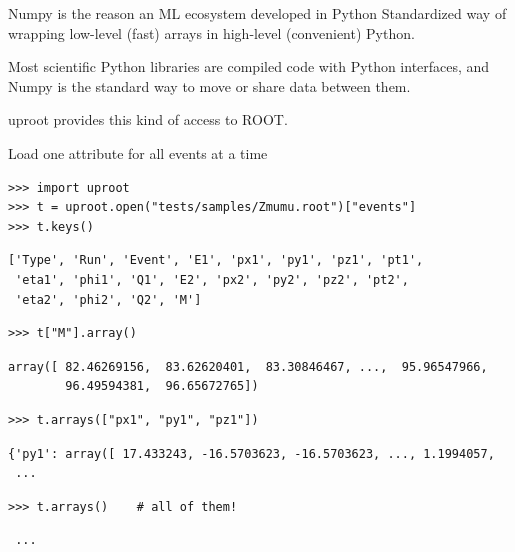 \documentclass[aspectratio=169]{beamer}
\begin{document}
\begin{frame}{Numpy is the reason an ML ecosystem developed in Python}
\vspace{0.5 cm}
\Large
Standardized way of wrapping low-level (fast) arrays in high-level (convenient) Python.

\vspace{0.75 cm}
Most scientific Python libraries are compiled code with Python interfaces, and Numpy is the standard way to move or share data between them.

\vspace{0.75 cm}
uproot provides this kind of access to ROOT.
\end{frame}

\begin{frame}[fragile]{Load one attribute for all events at a time}
\vspace{0.1 cm}
\small
\begin{verbatim}
>>> import uproot
>>> t = uproot.open("tests/samples/Zmumu.root")["events"]
>>> t.keys()
\end{verbatim}
\begin{verbatim}
['Type', 'Run', 'Event', 'E1', 'px1', 'py1', 'pz1', 'pt1',
 'eta1', 'phi1', 'Q1', 'E2', 'px2', 'py2', 'pz2', 'pt2',
 'eta2', 'phi2', 'Q2', 'M']
\end{verbatim}
\begin{verbatim}
>>> t["M"].array()
\end{verbatim}
\begin{verbatim}
array([ 82.46269156,  83.62620401,  83.30846467, ...,  95.96547966,
        96.49594381,  96.65672765])
\end{verbatim}
\begin{verbatim}
>>> t.arrays(["px1", "py1", "pz1"])
\end{verbatim}
\begin{verbatim}
{'py1': array([ 17.433243, -16.5703623, -16.5703623, ..., 1.1994057,
 ...
\end{verbatim}
\begin{verbatim}
>>> t.arrays()    # all of them!
\end{verbatim}
\begin{verbatim}
 ...
\end{verbatim}
\end{frame}
\end{document}
